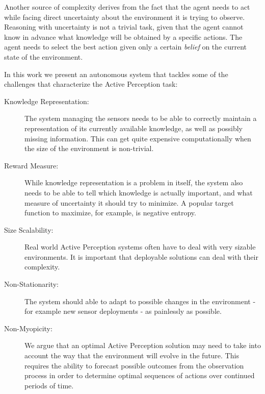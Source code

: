 Another source of complexity derives from the fact that the agent needs to act while facing direct
uncertainty about the environment it is trying to observe. Reasoning with uncertainty is not a
trivial task, given that the agent cannot know in advance what knowledge will be obtained by a
specific actions. The agent needs to select the best action given only a certain \textit{belief} on
the current state of the environment.

In this work we present an autonomous system that tackles some  of the challenges that characterize
the Active Perception task:

\begin{description}
\item[Knowledge Representation:] The system managing the sensors needs to be able to correctly
    maintain a representation of its currently available knowledge, as well as possibly missing
    information. This can get quite expensive computationally when the size of the environment is
    non-trivial.
\item[Reward Measure:] While knowledge representation is a problem in itself, the system also needs
    to be able to tell which knowledge is actually important, and what measure of uncertainty it
    should try to minimize. A popular target function to maximize, for example, is negative entropy.
\item[Size Scalability:] Real world Active Perception systems often have to deal with very
sizable environments. It is important that deployable solutions can deal with their complexity.
\item[Non-Stationarity:] The system should able to adapt to possible changes in the environment -
for example new sensor deployments - as painlessly as possible.
\item[Non-Myopicity:] We argue that an optimal Active Perception solution may need to take into
    account the way that the environment will evolve in the future. This requires the ability to
    forecast possible outcomes from the observation process in order to determine optimal sequences
    of actions over continued periods of time.
\end{description}

